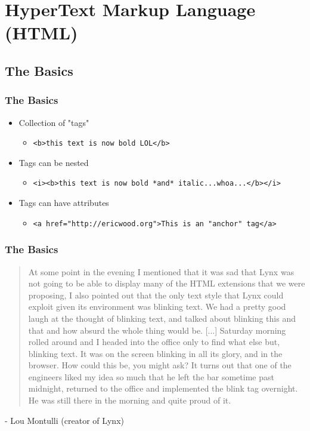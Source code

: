 \documentclass[10pt]{beamer}
\begin{document}
\section{HyperText Markup Language (HTML)}
\subsection{The Basics}
\frame
{
  \frametitle{The Basics}

  \begin{itemize}
    \item Collection of "tags"
      \begin{itemize}
        \item \lstinline|<b>this text is now bold LOL</b>|
      \end{itemize}
    \item Tags can be nested
      \begin{itemize}
        \item \lstinline|<i><b>this text is now bold *and* italic...whoa...</b></i>|
      \end{itemize}
    \item Tags can have attributes
      \begin{itemize}
        \item \lstinline|<a href="http://ericwood.org">This is an "anchor" tag</a>|
      \end{itemize}
  \end{itemize}
}

\frame
{
  \frametitle{The Basics}

  \begin{quotation}
    At some point in the evening I mentioned that it was sad that Lynx was not going to be able to display many of the HTML extensions that we were proposing, I also pointed out that the only text style that Lynx could exploit given its environment was blinking text. We had a pretty good laugh at the thought of blinking text, and talked about blinking this and that and how absurd the whole thing would be. [...] Saturday morning rolled around and I headed into the office only to find what else but, blinking text. It was on the screen blinking in all its glory, and in the browser. How could this be, you might ask? It turns out that one of the engineers liked my idea so much that he left the bar sometime past midnight, returned to the office and implemented the blink tag overnight. He was still there in the morning and quite proud of it.
  \end{quotation}
  - Lou Montulli (creator of Lynx)
}
\end{document}
